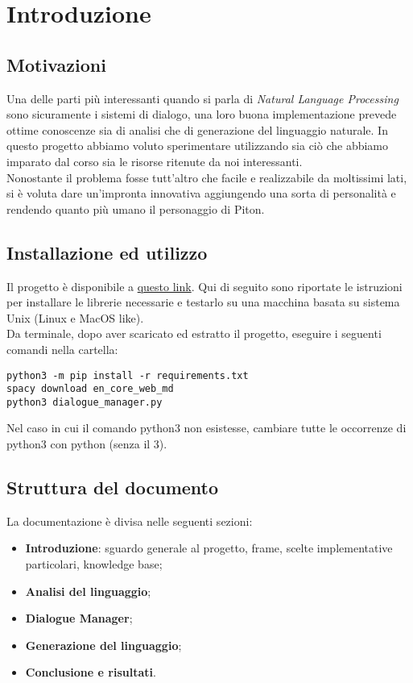 \section{Introduzione}

\subsection{Motivazioni}
Una delle parti più interessanti quando si parla di \textit{Natural Language Processing} sono sicuramente i sistemi di dialogo, una loro buona implementazione prevede ottime conoscenze sia di analisi che di generazione del linguaggio naturale. In questo progetto abbiamo voluto sperimentare utilizzando sia ciò che abbiamo imparato dal corso sia le risorse ritenute da noi interessanti.
\\
Nonostante il problema fosse tutt'altro che facile e realizzabile da moltissimi lati, si è voluta dare un'impronta innovativa aggiungendo una sorta di personalità e rendendo quanto più umano il personaggio di Piton.

\subsection{Installazione ed utilizzo}
Il progetto è disponibile a \href{https://github.com/federicotorrielli/pitonNLG}{questo link}. Qui di seguito sono riportate le istruzioni per installare le librerie necessarie e testarlo su una macchina basata su sistema Unix (Linux e MacOS like).
\\
Da terminale, dopo aver scaricato ed estratto il progetto, eseguire i seguenti comandi nella cartella:
\lstset{
  language=bash,
  basicstyle=\ttfamily
}
\begin{lstlisting}
python3 -m pip install -r requirements.txt
spacy download en_core_web_md
python3 dialogue_manager.py
\end{lstlisting}
Nel caso in cui il comando python3 non esistesse, cambiare tutte le occorrenze di python3 con python (senza il 3).

\subsection{Struttura del documento}
La documentazione è divisa nelle seguenti sezioni:
\begin{itemize}
    \item \textbf{Introduzione}: sguardo generale al progetto, frame, scelte implementative particolari, knowledge base;
    \item \textbf{Analisi del linguaggio};
    \item \textbf{Dialogue Manager};
    \item \textbf{Generazione del linguaggio};
    \item \textbf{Conclusione e risultati}.
\end{itemize}

